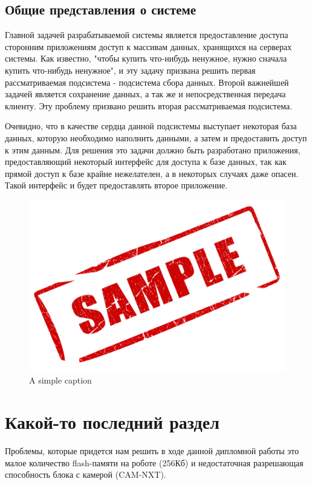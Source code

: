 \subsection{Общие представления о системе}

Главной задачей разрабатываемой системы является предоставление доступа сторонним приложениям доступ к массивам данных, хранящихся на серверах системы. Как известно, "чтобы купить что-нибудь ненужное, нужно сначала купить что-нибудь ненужное", и эту задачу призвана решить первая рассматриваемая подсистема - подсистема сбора данных. Второй важнейшей задачей является сохранение данных, а так же и непосредственная передача клиенту. Эту проблему призвано решить вторая рассматриваемая подсистема.

Очевидно, что в качестве сердца данной подсистемы выступает некоторая база данных, которую необходимо наполнить данными, а затем и предоставить доступ к этим данным. Для решения это задачи должно быть разработано приложения, предоставляющий некоторый интерфейс для доступа к базе данных, так как прямой доступ к базе крайне нежелателен, а в некоторых случаях даже опасен. Такой интерфейс и будет предоставлять второе приложение.

\begin{figure}[ht!]
 \centering 
 \includegraphics[width=\textwidth]{inc/raster/sample.jpg} 
 \caption{A simple caption} 
 \label{overflow} 
\end{figure}



\section{Какой-то последний раздел}
Проблемы, которые придется нам решить в ходе данной дипломной работы это малое количество flash-памяти на роботе (256Кб) и недостаточная разрешающая способность блока с камерой (CAM-NXT).

